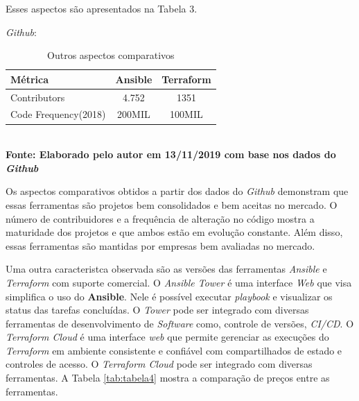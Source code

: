 Esses aspectos são apresentados na Tabela 3.

 \textit{Github}: 
   \begin{table}[H]
	\centering
	\caption{\hspace{0.1cm} Outros aspectos comparativos}
	\vspace{-0.3cm} %
	\label{tab:tabela3}
	\begin{tabular}{l|c|c}
  \hline
    \textbf{Métrica}	& \textbf{Ansible} & \textbf{Terraform} \\
    \hline
  Contributors & 4.752  & 1351\\
  Code Frequency(2018)  & 200MIL  &   100MIL  \\
     \hline
 \end{tabular}
 	\vspace{.1cm}  %
	\small
	{\footnotesize\\ \textbf{Fonte: Elaborado pelo autor em 13/11/2019 com base nos dados do \textit{Github}}}
\end{table}

Os aspectos comparativos obtidos a partir dos dados do \textit{Github} demonstram que essas ferramentas são projetos bem consolidados e bem aceitas no mercado. O número de contribuidores e a frequência de alteração no código mostra a maturidade dos projetos e que ambos estão em evolução constante. Além disso, essas ferramentas são mantidas por empresas bem avaliadas no mercado.  

Uma outra caracteristca observada são as versões das ferramentas \textit{Ansible} e \textit{Terraform} com suporte comercial. O \textit{Ansible Tower} é uma interface \textit{Web} que visa simplifica o uso do \textbf{Ansible}. Nele é possível executar \textit{playbook} e visualizar os status das tarefas concluídas. O \textit{Tower} pode ser integrado com diversas ferramentas de desenvolvimento de \textit{Software} como, controle de versões, \textit{CI/CD}. O \textit{Terraform Cloud} é uma interface \textit{web} que permite gerenciar as execuções do \textit{Terraform} em ambiente consistente e confiável com compartilhados de estado e controles de acesso. O \textit{Terraform Cloud} pode ser integrado com diversas ferramentas.  A Tabela \ref{tab:tabela4} mostra a comparação de preços entre as ferramentas. 

